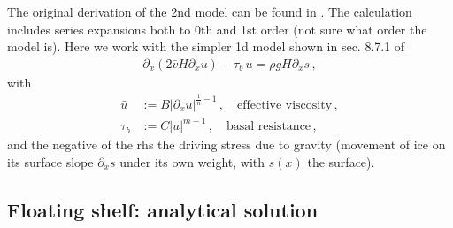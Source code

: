 \documentclass[11pt,a4paper]{article}
\newcommand{\p}{\partial}
\begin{document}
The original derivation of the 2nd model can be found in \cite{MacAyeal_SSA}. The calculation includes series expansions both to 0th and 1st order (not sure what order the model is). Here we work with the simpler 1d model shown in sec. 8.7.1 of \cite{karthaus_notes}
\begin{align}
    \p_x \left( 2 \bar{v} H \p_x u \right) - \tau_b\, u = \rho g H \p_x s
    \,,
    \label{eq:SSA_1d}
\end{align}
with
\begin{align*}
    \bar{u} 
    &:= B | \p_x u |^{\frac{1}{n}-1} 
    \,,
    \quad \text{effective viscosity}\,,
    \\
    \tau_b 
    &:= C |u|^{m-1}
    \,,
    \quad \text{basal resistance}\,,
\end{align*}
and the negative of the rhs the driving stress due to gravity (movement of ice on its surface slope $\p_x s$ under its own weight, with $s(x)$ the surface). 

\subsection{Floating shelf: analytical solution}
\end{document}
